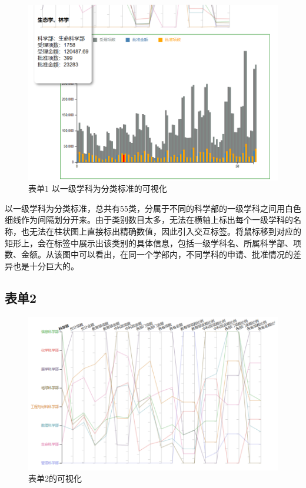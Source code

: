 \documentclass[a4paper,11pt,UTF8]{ctexart}
\begin{document}
\begin{figure}[h]
\centering
\includegraphics[scale=0.3]{QQ20191028160731.png}
\caption{表单1 以一级学科为分类标准的可视化}
\end{figure}

以一级学科为分类标准，总共有55类，分属于不同的科学部的一级学科之间用白色细线作为间隔划分开来。由于类别数目太多，无法在横轴上标出每个一级学科的名称，也无法在柱状图上直接标出精确数值，因此引入交互标签。将鼠标移到对应的矩形上，会在标签中展示出该类别的具体信息，包括一级学科名、所属科学部、项数、金额。从该图中可以看出，在同一个学部内，不同学科的申请、批准情况的差异也是十分巨大的。

\subsection{表单2}

\begin{figure}[h]
\centering
\includegraphics[scale=0.35]{QQ20191028161736.png}
\caption{表单2的可视化}
\end{figure}
\end{document}
